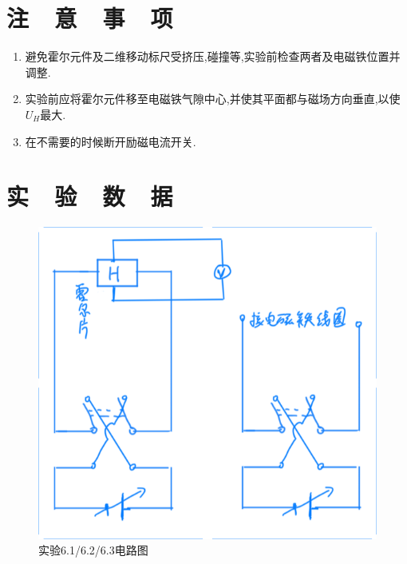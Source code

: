 \documentclass{thuemp}
\begin{document}
\section{注~~意~~事~~项}
\begin{enumerate} 
	\item 避免霍尔元件及二维移动标尺受挤压,碰撞等,实验前检查两者及电磁铁位置并调整.
	\item 实验前应将霍尔元件移至电磁铁气隙中心,并使其平面都与磁场方向垂直,以使$U_{H}$最大.
	\item 在不需要的时候断开励磁电流开关.
\end{enumerate}
\section{实~~验~~数~~据}
\begin{figure}[H]
	\centering
	\includegraphics[width=0.8\linewidth]{./image/9.png}
	\caption{实验6.1/6.2/6.3电路图} \label{fig:eg}
\end{figure}
\end{document}

